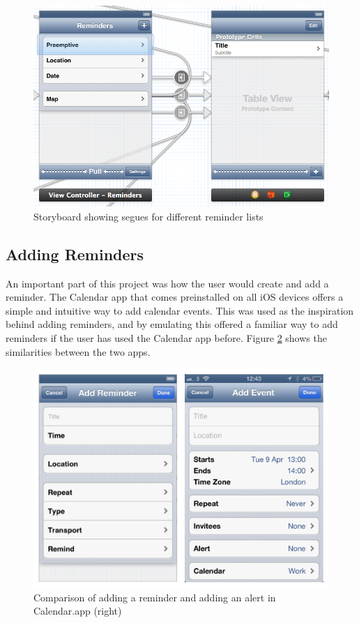 \documentclass[12pt]{report}
\begin{document}
\begin{figure}[H]
\centering
\includegraphics[scale=0.3]{images/reminder-list}
\caption{Storyboard showing segues for different reminder lists}
\label{fig:reminderlists}
\end{figure}

\subsection{Adding Reminders}

An important part of this project was how the user would create and add a reminder. The Calendar app that comes preinstalled on all iOS devices offers a simple and intuitive way to add calendar events. This was used as the inspiration behind adding reminders, and by emulating this offered a familiar way to add reminders if the user has used the Calendar app before. Figure \ref{fig:addreminder} shows the similarities between the two apps.\\

\begin{figure}[H]
\centering
\includegraphics[scale=0.5]{images/add-reminder}
\caption{Comparison of adding a reminder and adding an alert in Calendar.app (right)}
\label{fig:addreminder}
\end{figure}
\end{document}

